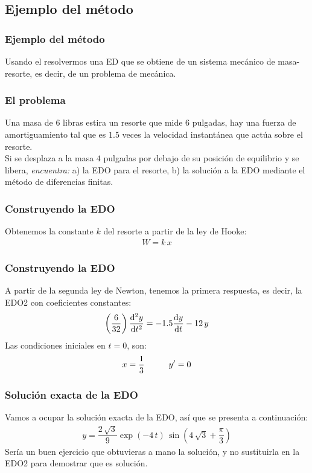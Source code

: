 \subsection{Ejemplo del método}
\begin{frame}
\frametitle{Ejemplo del método}
Usando el  resolvermos una ED que se obtiene de un sistema mecánico de masa-resorte, es decir, de un problema de mecánica.
\end{frame}
\begin{frame}
\frametitle{El problema}
Una masa de $6$ libras estira un resorte que mide $6$ pulgadas, hay una fuerza de amortiguamiento tal que es $1.5$ veces la velocidad instantánea que actúa sobre el resorte.
\\
\bigskip
\pause
Si se desplaza a la masa $4$ pulgadas por debajo de su posición de equilibrio y se libera, \emph{encuentra:} a) la EDO para el resorte, b) la solución a la EDO mediante el método de diferencias finitas.
\end{frame}
\begin{frame}
\frametitle{Construyendo la EDO}
Obtenemos la constante $k$ del resorte a partir de la ley de Hooke:
\begin{align}
W = k \, x
\end{align}
\end{frame}
\begin{frame}
\frametitle{Construyendo la EDO}
A partir de la segunda ley de Newton, tenemos la primera respuesta, es decir, la EDO2 con coeficientes constantes:
\begin{align}
\left( \dfrac{6}{32} \right) \dv[2]{y}{t} = -1.5 \dv{y}{t} - 12 \, y
\label{eq:ecuacion_18}
\end{align}
Las condiciones iniciales en $t = 0$, son:
\begin{align*}
x = \dfrac{1}{3} \hspace{1cm} {y}^{\prime} = 0
\end{align*}
\end{frame}
\begin{frame}
\frametitle{Solución exacta de la EDO}
Vamos a ocupar la solución exacta de la EDO, así que se presenta a continuación:
\begin{align}
y = \dfrac{2 \, \sqrt{3}}{9} \exp(-4 \, t) \, \sin \left( 4 \, \sqrt{3} + \dfrac{\pi}{3}\right)
\label{eq:ecuacion_19}
\end{align}
Sería un buen ejercicio que obtuvieras a mano la solución, y no sustituirla en la EDO2 para demostrar que es solución.
\end{frame}
